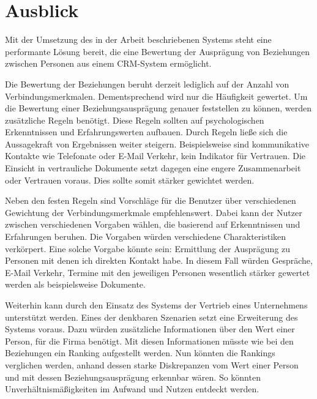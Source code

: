\section{Ausblick}
\label{ch:Ergebnis:sec:Ausblick}

Mit der Umsetzung des in der Arbeit beschriebenen Systems steht eine performante Lösung bereit, die eine Bewertung der Ausprägung von Beziehungen zwischen Personen aus einem CRM-System ermöglicht.

Die Bewertung der Beziehungen beruht derzeit lediglich auf der Anzahl von Verbindungsmerkmalen. Dementsprechend wird nur die Häufigkeit gewertet. Um die Bewertung einer Beziehungsausprägung genauer feststellen zu können, werden zusätzliche Regeln benötigt. Diese Regeln sollten auf psychologischen Erkenntnissen und Erfahrungswerten aufbauen. Durch Regeln ließe sich die Aussagekraft von Ergebnissen weiter steigern. Beispielsweise sind kommunikative Kontakte wie Telefonate oder E-Mail Verkehr, kein Indikator für Vertrauen. Die Einsicht in vertrauliche Dokumente setzt dagegen eine engere Zusammenarbeit oder Vertrauen voraus. Dies sollte somit stärker gewichtet werden. 

Neben den festen Regeln sind Vorschläge für die Benutzer über verschiedenen Gewichtung der Verbindungsmerkmale empfehlenswert. Dabei kann der Nutzer zwischen verschiedenen Vorgaben wählen, die basierend auf Erkenntnissen und Erfahrungen beruhen. Die Vorgaben würden verschiedene Charakteristiken verkörpert. Eine solche Vorgabe könnte sein: Ermittlung der Ausprägung zu Personen mit denen ich direkten Kontakt habe. In diesem Fall würden Gespräche, E-Mail Verkehr, Termine mit den jeweiligen Personen wesentlich stärker gewertet werden als beispielsweise Dokumente.

Weiterhin kann durch den Einsatz des Systems der Vertrieb eines Unternehmens unterstützt werden. Eines der denkbaren Szenarien setzt eine Erweiterung des Systems voraus. Dazu würden zusätzliche Informationen über den Wert einer Person, für die Firma benötigt. Mit diesen Informationen müsste wie bei den Beziehungen ein Ranking aufgestellt werden. Nun könnten die Rankings verglichen werden, anhand dessen starke Diskrepanzen vom Wert einer Person und mit dessen Beziehungsausprägung erkennbar wären. So könnten Unverhältnismäßigkeiten im Aufwand und Nutzen entdeckt werden.


